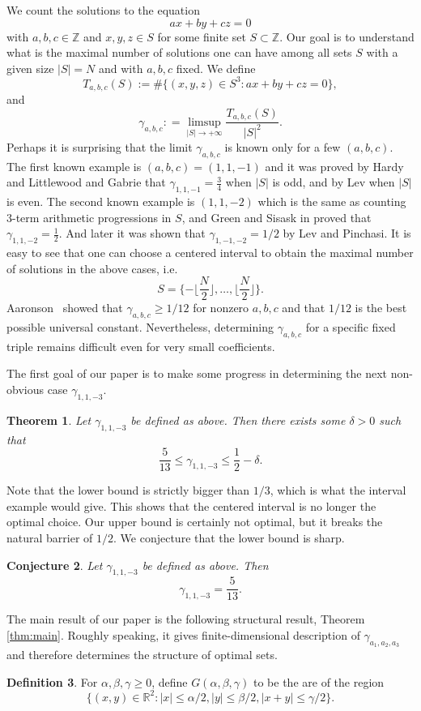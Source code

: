 \documentclass[12pt, notitlepage]{amsart}
\numberwithin{equation}{section}
\def\R{\mathbb R}
\def\Z{\mathbb Z}
\newtheorem{theorem}{Theorem}[section]
\newtheorem{conjecture}[theorem]{Conjecture}
\theoremstyle{remark}
\theoremstyle{definition}
\newtheorem{definition}[theorem]{Definition}
\theoremstyle{remark}
\numberwithin{equation}{section}
\begin{document}
We count the solutions to the equation $$ax+by +cz = 0$$ with $a, b, c \in \mathbb{Z}$ and $x, y, z \in S$ for some finite set $S\subset \Z$. Our goal is to understand what is the maximal number of solutions one can have among all sets $S$ with a given size $|S|=N$ and with $a,b,c$ fixed. We define 
$$
T_{a,b,c}(S) :=   \#\{(x,y,z)\in S^3:ax+by+cz=0\},
$$
and
\begin{equation}
    \gamma_{a, b, c}: = \limsup_{|S|\to +\infty}\frac{ T_{a,b,c}(S)} {|S|^{2}}.
\end{equation}
Perhaps it is surprising that the limit $\gamma_{a, b, c}$ is known only for a few $(a,b,c)$.
The first known example is $(a, b, c) = (1,1,-1) $ and it was proved by Hardy and Littlewood \cite{hardy1928notes, hardy1952inequalities} and Gabrie\cite{gabriel1931rearrangement} that $\gamma_{1,1,-1} = \frac{3}{4}$ when $|S|$ is odd, and by Lev \cite{lev1998number} when $|S|$ is even. The second known example is $(1,1,-2)$ which is the same as counting 3-term arithmetic progressions in $S$, and Green and Sisask in \cite{green2008maximal} proved that $\gamma_{1,1,-2} = \frac{1}{2}$. And later it was shown that $\gamma_{1, -1, -2}=1/2$ by \cite{lev2014solving} Lev and Pinchasi. It is easy to see that one can choose a centered interval to obtain the maximal number of solutions in the above cases, i.e. 
\[S= \{-\Big\lfloor \frac{N}{2}\Big\rfloor, \dots,  \Big\lfloor \frac{N}{2} \Big\rfloor \}.\]
Aaronson~\cite{Aa} showed that $\gamma_{a,b,c} \geq 1/12$ for nonzero $a,b,c$ and that $1/12$ is the best possible
universal constant. Nevertheless, determining $\gamma_{a,b,c}$ for a
specific fixed triple remains difficult even for very small coefficients.


The first goal of our paper is to make some progress in determining the next non-obvious case $\gamma_{1,1,-3}$. 

\begin{theorem}\label{THM: 113}
    Let $\gamma_{1,1,-3}$ be defined as above. Then there exists some $\delta>0$ such that 
    \[\frac{5}{13} \le \gamma_{1,1,-3} \le \frac{1}{2}-\delta.\]
\end{theorem}
 Note that the lower bound is strictly bigger than $1/3$, which is what the interval example would give. This shows that the centered interval is no longer the optimal choice. Our upper bound is certainly not optimal, but it breaks the natural barrier of $1/2$. We conjecture that the lower bound is sharp.  
\begin{conjecture}\label{conj}
    Let $\gamma_{1,1,-3}$ be defined as above. Then 
    \[\gamma_{1,1,-3} = \frac{5}{13}. \]
\end{conjecture}
The main result of our paper is the following structural result, Theorem \ref{thm:main}. Roughly speaking, it gives finite-dimensional description of $\gamma_{a_1,a_2,a_3}$ and therefore determines the structure of optimal sets. 
\begin{definition}\label{defn:G}
For $\alpha,\beta,\gamma \geq 0$, define $G(\alpha,\beta,\gamma)$ to be the are of the region
$$
\{(x,y) \in \R^2: |x| \leq \alpha/2, |y| \leq \beta/2, |x+y| \leq \gamma/2\}.
$$
\end{definition}
\end{document}
